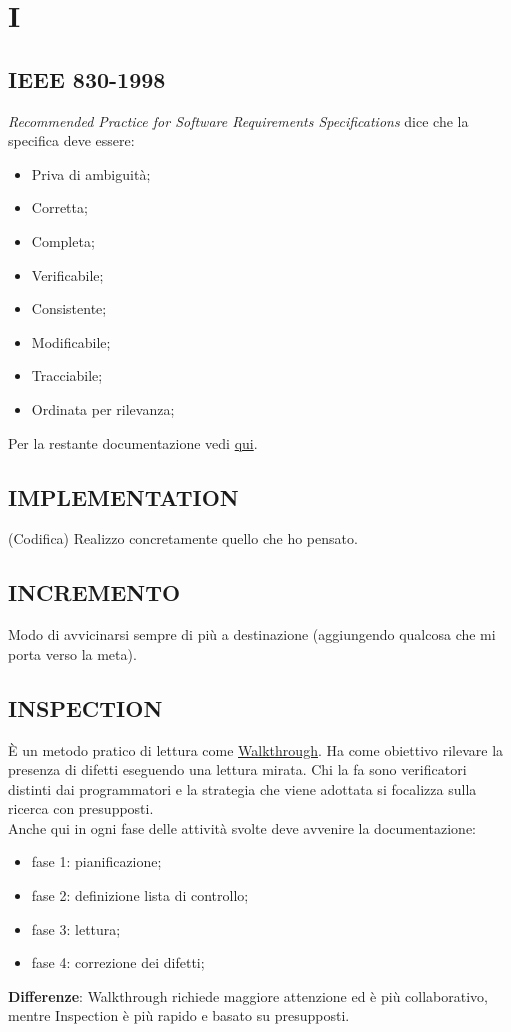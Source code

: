 \newpage
	\section{I} \label{sec:I}
	
		\subsection{IEEE 830-1998}	 \label{ieee830}
		\textit{Recommended Practice for Software Requirements Specifications} dice che la specifica deve essere:
			\begin{itemize}
				\item Priva di ambiguità;
				\item Corretta;
				\item Completa;
				\item Verificabile;
				\item Consistente;
				\item Modificabile;
				\item Tracciabile;
				\item Ordinata per rilevanza;
			\end{itemize}
		Per la restante documentazione vedi \href{https://www.cs.purdue.edu/homes/apm/courses/BITSC461-fall03/miller-guidelines/IEEE830-1998.html}{qui}.
	
		\subsection{IMPLEMENTATION}  \label{implementation}
		(Codifica) Realizzo concretamente quello che ho pensato.
		
		\subsection{INCREMENTO}  \label{incremento}
		Modo di avvicinarsi sempre di più a destinazione (aggiungendo qualcosa che mi porta verso la meta).
		
		\subsection{INSPECTION}		\label{inspection}
		È un metodo pratico di lettura come \underline{\hyperref[walkthrough]{Walkthrough}}. Ha come obiettivo rilevare la presenza di difetti eseguendo una lettura mirata. Chi la fa sono verificatori distinti dai programmatori e la strategia che viene adottata si focalizza sulla ricerca con presupposti. \\
		Anche qui in ogni fase delle attività svolte deve avvenire la documentazione:
		\begin{itemize}
			\item fase 1: pianificazione;
			\item fase 2: definizione lista di controllo;
			\item fase 3: lettura;
			\item fase 4: correzione dei difetti;
		\end{itemize}
		\textbf{Differenze}: Walkthrough richiede maggiore attenzione ed è più collaborativo, mentre Inspection è più rapido e basato su presupposti.
		
